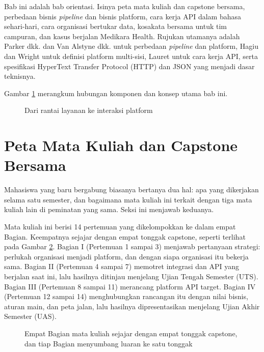 Bab ini adalah bab orientasi. Isinya peta mata kuliah dan capstone bersama,
perbedaan bisnis \textit{pipeline} dan bisnis platform, cara kerja API dalam
bahasa sehari-hari, cara organisasi bertukar data, kosakata bersama untuk tim
campuran, dan kasus berjalan Medikara Health. Rujukan utamanya adalah Parker dkk.
\cite{parker2016platform} dan Van Alstyne dkk. \cite{c01-vanalstyne2016pipelines}
untuk perbedaan \textit{pipeline} dan platform, Hagiu dan Wright
\cite{hagiu2015multisided} untuk definisi platform multi-sisi, Lauret
\cite{lauret2025design} untuk cara kerja API, serta spesifikasi HyperText
Transfer Protocol (HTTP) \cite{rfc9110} dan JSON \cite{c01-rfc8259} yang
menjadi dasar teknisnya.

Gambar \ref{fig:ch01-ilustrasi-bab} merangkum hubungan komponen dan konsep utama bab ini.
\begin{figure}[!htb]
  \centering
  
  \caption{Dari rantai layanan ke interaksi platform}
  \label{fig:ch01-ilustrasi-bab}
\end{figure}

\section{Peta Mata Kuliah dan Capstone Bersama}

Mahasiswa yang baru bergabung biasanya bertanya dua hal: apa yang dikerjakan
selama satu semester, dan bagaimana mata kuliah ini terkait dengan tiga mata
kuliah lain di peminatan yang sama. Seksi ini menjawab keduanya.

Mata kuliah ini berisi 14 pertemuan yang dikelompokkan ke dalam empat Bagian.
Keempatnya sejajar dengan empat tonggak capstone, seperti terlihat pada Gambar
\ref{fig:ch01-peta-capstone}. Bagian I (Pertemuan 1 sampai 3) menjawab
pertanyaan strategi: perlukah organisasi menjadi platform, dan dengan siapa
organisasi itu bekerja sama. Bagian II (Pertemuan 4 sampai 7) memotret integrasi
dan API yang berjalan saat ini, lalu hasilnya ditinjau menjelang Ujian Tengah
Semester (UTS). Bagian III (Pertemuan 8 sampai 11) merancang platform API
target. Bagian IV (Pertemuan 12 sampai 14) menghubungkan rancangan itu dengan
nilai bisnis, aturan main, dan peta jalan, lalu hasilnya dipresentasikan
menjelang Ujian Akhir Semester (UAS).

\begin{figure}[!htb]
  \centering
  
  \caption{Empat Bagian mata kuliah sejajar dengan empat tonggak capstone, dan
           tiap Bagian menyumbang luaran ke satu tonggak}
  \label{fig:ch01-peta-capstone}
\end{figure}

